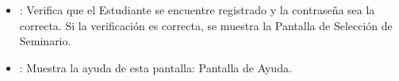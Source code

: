 \begin{itemize}
	\item {}: Verifica que el Estudiante se encuentre registrado y la contraseña sea la correcta. Si la verificación es correcta, se muestra la Pantalla de Selección de Seminario.
	\item {}: Muestra la ayuda de esta pantalla: Pantalla de Ayuda.
\end{itemize}

